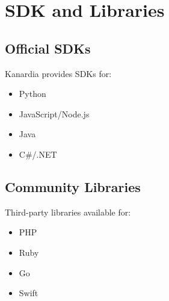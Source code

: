 \section{SDK and Libraries}

\subsection{Official SDKs}

Kanardia provides SDKs for:

\begin{itemize}
    \item Python
    \item JavaScript/Node.js
    \item Java
    \item C\#/.NET
\end{itemize}

\subsection{Community Libraries}

Third-party libraries available for:

\begin{itemize}
    \item PHP
    \item Ruby
    \item Go
    \item Swift
\end{itemize}
